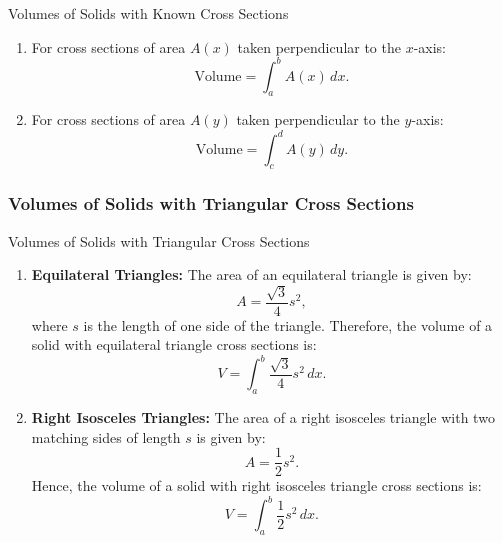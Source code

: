 \documentclass[12pt]{article}
\theoremstyle{beautifulthm}
\begin{document}
\begin{Note}{Volumes of Solids with Known Cross Sections}{}
  \begin{enumerate}
    \item For cross sections of area $A(x)$ taken perpendicular to the $x$-axis:
    \[
    \text{Volume} = \int_a^b A(x) \, dx.
    \]


    \item For cross sections of area $A(y)$ taken perpendicular to the $y$-axis:
    \[
    \text{Volume} = \int_c^d A(y) \, dy.
    \]
\end{enumerate}  
\end{Note}

\subsubsection{Volumes of Solids with Triangular Cross Sections}

\begin{mytheorem}{Volumes of Solids with Triangular Cross Sections}{}
\begin{enumerate}
    \item \textbf{Equilateral Triangles:} The area of an equilateral triangle is given by:
    \[
    A = \frac{\sqrt{3}}{4}s^2,
    \]
    where $s$ is the length of one side of the triangle. Therefore, the volume of a solid with equilateral triangle cross sections is:
    \[
    V = \int_a^b \frac{\sqrt{3}}{4}s^2 \, dx.
    \]

    \item \textbf{Right Isosceles Triangles:} The area of a right isosceles triangle with two matching sides of length $s$ is given by:
    \[
    A = \frac{1}{2}s^2.
    \]
    Hence, the volume of a solid with right isosceles triangle cross sections is:
    \[
    V = \int_a^b \frac{1}{2}s^2 \, dx.
    \]
\end{enumerate}
\end{mytheorem}
\end{document}
